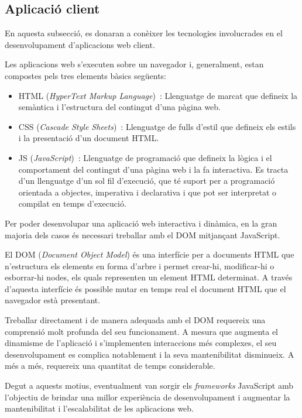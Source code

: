\documentclass[a4paper,12pt]{ThesisStyle}
\begin{document}
\subsection{Aplicació client}
\label{subsec:aplicacio_client}

En aquesta subsecció, es donaran a conèixer les tecnologies involucrades en el desenvolupament d'aplicacions web client.

Les aplicacions web s'executen sobre un navegador i, generalment, estan compostes pels tres elements bàsics següents:
\begin{itemize}
  \item HTML (\textit{HyperText Markup Language})~\cite{HTML}: Llenguatge de marcat que defineix la semàntica i l'estructura del contingut d'una pàgina web.
  \item CSS (\textit{Cascade Style Sheets})~\cite{CSS}: Llenguatge de fulls d'estil que defineix els estils i la presentació d'un document HTML.
  \item JS (\textit{JavaScript})~\cite{JS}: Llenguatge de programació que defineix la lògica i el comportament del contingut d'una pàgina web i la fa interactiva. Es tracta d'un llenguatge d'un sol fil d'execució, que té suport per a programació orientada a objectes, imperativa i declarativa i que pot ser interpretat o compilat en temps d'execució.
\end{itemize}

Per poder desenvolupar una aplicació web interactiva i dinàmica, en la gran majoria dels casos és necessari treballar amb el DOM mitjançant JavaScript.

El DOM (\textit{Document Object Model}) és una interfície per a documents HTML que n'estructura els elements en forma d'arbre i permet crear-hi, modificar-hi o esborrar-hi nodes, els quals representen un element HTML determinat. A través d'aquesta interfície és possible mutar en temps real el document HTML que el navegador està presentant.

Treballar directament i de manera adequada amb el DOM requereix una comprensió molt profunda del seu funcionament. A mesura que augmenta el dinamisme de l'aplicació i s'implementen interaccions més complexes, el seu desenvolupament es complica notablement i la seva mantenibilitat disminueix. A més a més, requereix una quantitat de temps considerable.

Degut a aquests motius, eventualment van sorgir els \textit{frameworks} JavaScript amb l'objectiu de brindar una millor experiència de desenvolupament i augmentar la mantenibilitat i l'escalabilitat de les aplicacions web.
\end{document}
